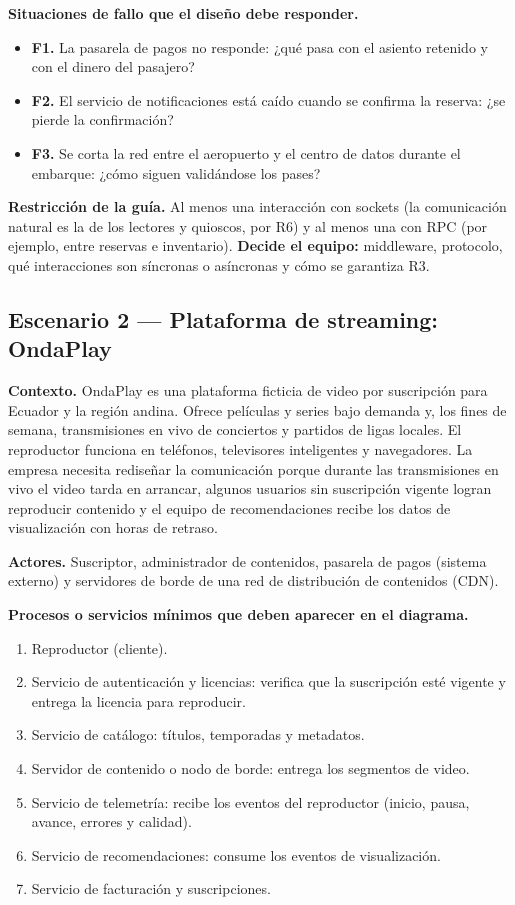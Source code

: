 \documentclass[10pt]{article}
\begin{document}
\textbf{Situaciones de fallo que el diseño debe responder.}
\begin{itemize}[leftmargin=1.6em]
	\item \textbf{F1.} La pasarela de pagos no responde: ¿qué pasa con el asiento retenido y con el dinero del pasajero?
	\item \textbf{F2.} El servicio de notificaciones está caído cuando se confirma la reserva: ¿se pierde la confirmación?
	\item \textbf{F3.} Se corta la red entre el aeropuerto y el centro de datos durante el embarque: ¿cómo siguen validándose los pases?
\end{itemize}

\textbf{Restricción de la guía.} Al menos una interacción con sockets (la comunicación natural es la de los lectores y quioscos, por R6) y al menos una con RPC (por ejemplo, entre reservas e inventario). \textbf{Decide el equipo:} middleware, protocolo, qué interacciones son síncronas o asíncronas y cómo se garantiza R3.

\subsection{Escenario 2 --- Plataforma de streaming: OndaPlay}

\textbf{Contexto.} OndaPlay es una plataforma ficticia de video por suscripción para Ecuador y la región andina. Ofrece películas y series bajo demanda y, los fines de semana, transmisiones en vivo de conciertos y partidos de ligas locales. El reproductor funciona en teléfonos, televisores inteligentes y navegadores. La empresa necesita rediseñar la comunicación porque durante las transmisiones en vivo el video tarda en arrancar, algunos usuarios sin suscripción vigente logran reproducir contenido y el equipo de recomendaciones recibe los datos de visualización con horas de retraso.

\textbf{Actores.} Suscriptor, administrador de contenidos, pasarela de pagos (sistema externo) y servidores de borde de una red de distribución de contenidos (CDN).

\textbf{Procesos o servicios mínimos que deben aparecer en el diagrama.}
\begin{enumerate}[leftmargin=1.6em]
	\item Reproductor (cliente).
	\item Servicio de autenticación y licencias: verifica que la suscripción esté vigente y entrega la licencia para reproducir.
	\item Servicio de catálogo: títulos, temporadas y metadatos.
	\item Servidor de contenido o nodo de borde: entrega los segmentos de video.
	\item Servicio de telemetría: recibe los eventos del reproductor (inicio, pausa, avance, errores y calidad).
	\item Servicio de recomendaciones: consume los eventos de visualización.
	\item Servicio de facturación y suscripciones.
\end{enumerate}
\end{document}

